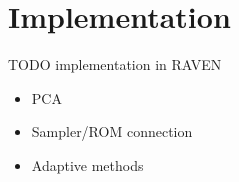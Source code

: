 \section{Implementation}
TODO implementation in RAVEN
\begin{itemize}
  \item PCA
  \item Sampler/ROM connection
  \item Adaptive methods
\end{itemize}
